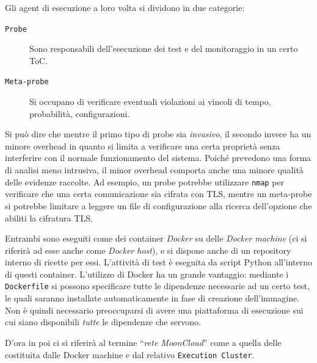 Gli agent di esecuzione a loro volta si dividono in due categorie:
\begin{description}
	\item[\texttt{Probe}]Sono responsabili dell'esecuzione dei test e del
	monitoraggio in un certo ToC.
	\item[\texttt{Meta-probe}]Si occupano di verificare eventuali violazioni ai
	vincoli di tempo, probabilità, configurazioni. 
\end{description}
Si può dire che mentre il primo tipo di probe sia \textit{invasivo}, il secondo invece
ha un minore overhead in quanto si limita a verificare una certa proprietà
senza interferire con il normale funzionamento del sistema.
Poiché prevedono una forma di analisi meno intrusiva, il minor overhead comporta
anche una minore qualità delle evidenze raccolte.
Ad esempio, un probe potrebbe utilizzare \texttt{nmap} per verificare che
una certa comunicazione sia cifrata con TLS, mentre un meta-probe si
potrebbe limitare a leggere un file di configurazione alla ricerca dell'opzione
che abiliti la cifratura TLS.

Entrambi sono eseguiti come dei container \textit{Docker} su delle \textit{Docker machine}
(ci si riferirà ad esse anche come \textit{Docker host}),
e si dispone anche di un repository interno di ricette per essi.
L'attività di test è eseguita da script Python all'interno di questi container.
L'utilizzo di Docker ha un grande vantaggio: mediante i \texttt{Dockerfile} si possono
specificare tutte le dipendenze necessarie ad un certo test, le quali saranno
installate automaticamente in fase di creazione dell'immagine. Non è quindi necessario
preoccuparsi di avere una piattaforma di esecuzione sui cui siano disponibili \textit{tutte}
le dipendenze che servono.

D'ora in poi ci si riferirà al termine ``\textit{rete MoonCloud}'' come a quella
delle costituita dalle Docker machine e dal relativo \texttt{Execution Cluster}.